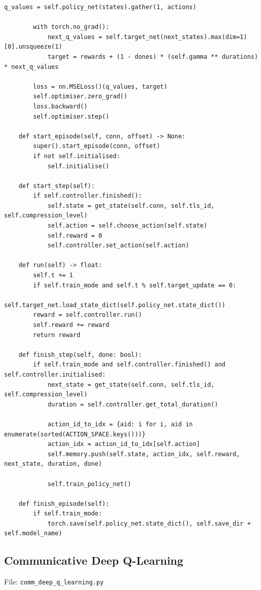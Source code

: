 \documentclass[a4paper]{report}
\begin{document}
\begin{lstlisting}[style=pythonstyle]
        q_values = self.policy_net(states).gather(1, actions)

        with torch.no_grad():
            next_q_values = self.target_net(next_states).max(dim=1)[0].unsqueeze(1)
            target = rewards + (1 - dones) * (self.gamma ** durations) * next_q_values

        loss = nn.MSELoss()(q_values, target)
        self.optimiser.zero_grad()
        loss.backward()
        self.optimiser.step()

    def start_episode(self, conn, offset) -> None:
        super().start_episode(conn, offset)
        if not self.initialised:
            self.initialise()

    def start_step(self):
        if self.controller.finished():
            self.state = get_state(self.conn, self.tls_id, self.compression_level)
            self.action = self.choose_action(self.state)
            self.reward = 0
            self.controller.set_action(self.action)

    def run(self) -> float:
        self.t += 1
        if self.train_mode and self.t % self.target_update == 0:
            self.target_net.load_state_dict(self.policy_net.state_dict())
        reward = self.controller.run()
        self.reward += reward
        return reward

    def finish_step(self, done: bool):
        if self.train_mode and self.controller.finished() and self.controller.initialised:
            next_state = get_state(self.conn, self.tls_id, self.compression_level)
            duration = self.controller.get_total_duration()

            action_id_to_idx = {aid: i for i, aid in enumerate(sorted(ACTION_SPACE.keys()))}
            action_idx = action_id_to_idx[self.action]
            self.memory.push(self.state, action_idx, self.reward, next_state, duration, done)

            self.train_policy_net()

    def finish_episode(self):
        if self.train_mode:
            torch.save(self.policy_net.state_dict(), self.save_dir + self.model_name)
\end{lstlisting}

\subsection{Communicative Deep Q-Learning}

File: \texttt{comm\_deep\_q\_learning.py}
\end{document}
